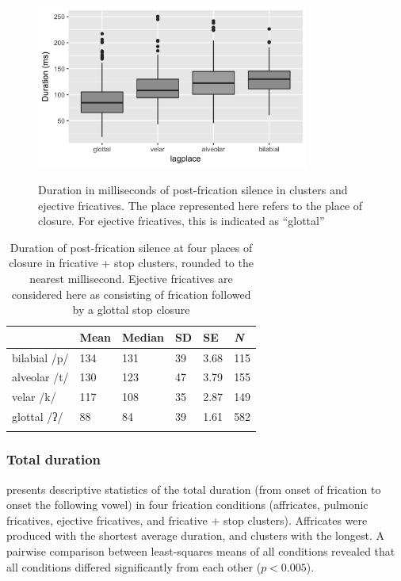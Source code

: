\documentclass[output=paper,colorlinks,citecolor=brown]{langscibook}
\begin{document}
    \begin{figure}
        \caption{Duration in milliseconds of post-frication silence in clusters and ejective fricatives. The place represented here refers to the place of closure. For ejective fricatives, this is indicated as ``glottal''}
       \includegraphics[width=0.8\textwidth]{figures/lagplace-grayscale.png}
        \label{fig:postfric-place}
    \end{figure}

    \begin{table}
        \caption[Summary of post-frication silence durations across place of closure]{Duration of post-frication silence at four places of closure in fricative + stop clusters, rounded to the nearest millisecond. Ejective fricatives are considered here as consisting of frication followed by a glottal stop closure}
    	\label{tab:postlag-ejclusters-summary}

    	\begin{tabularx}{\textwidth}{lYYYYY}
    		\lsptoprule
    		&{Mean}&{Median}&{SD}&{SE}&{\textit{N}}\\
    		\midrule
    		bilabial {/p/} &134 &131 &39 &3.68&115\\
    		alveolar {/t/} & 130& 123 &47 &3.79&155\\
    		velar {/k/} &117 &108 &35 &2.87&149\\
    		glottal /ʔ/ &88 &84 &39 &1.61&582\\
    		\lspbottomrule
    	\end{tabularx}
    \end{table}
    
\newpage
\subsubsection{Total duration}
 presents descriptive statistics of the total duration (from onset of frication to onset the following vowel) in four frication conditions (affricates, pulmonic fricatives, ejective fricatives, and fricative + stop clusters). Affricates were produced with the shortest average duration, and clusters with the longest. A pairwise comparison between least-squares means of all conditions revealed that all conditions differed significantly from each other ($p < 0.005$).
\end{document}
